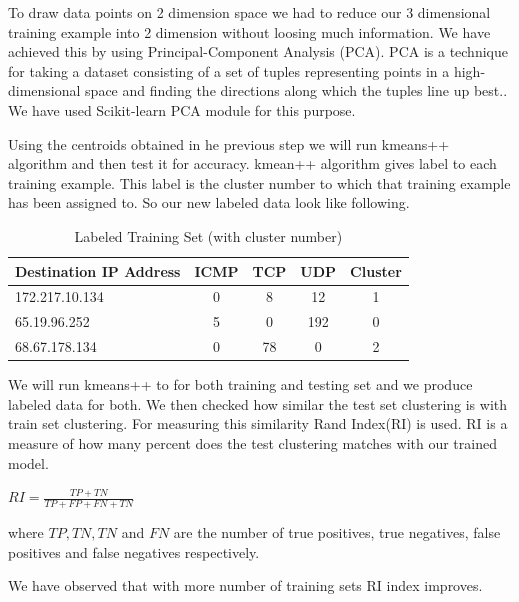 \documentclass[10pt,oneside,a4paper]{article}
\begin{document}
To draw data points on 2 dimension space we had to reduce our 3 dimensional training example into 2 dimension without loosing much information. We have achieved this by using Principal-Component Analysis (PCA). PCA is a technique for taking a dataset consisting of a set of tuples representing points in a high-dimensional space and finding the directions along which the tuples line up best.\cite{pca}. We have used Scikit-learn PCA module for this purpose.

Using the centroids obtained in he previous step we will run kmeans++ algorithm and then test it for accuracy. kmean++ algorithm gives label to each training example. This label is the cluster number to which that training example has been assigned to. So our new labeled data look like following.

\begin{table}[H]
\centering
  \begin{tabular}{| l | c | c | c | c |}
    \hline
    {Destination IP Address}  &ICMP  &TCP &UDP  &Cluster \\
    \hline
    172.217.10.134  & 0     & 8     & 12  &1  \\ \hline
    65.19.96.252    & 5     & 0     & 192 &0  \\ \hline
    68.67.178.134   & 0     & 78    & 0   &2  \\ \hline
  \end{tabular}
\caption{Labeled Training Set (with cluster number)} \label{table:labeled-set}
\end{table}


We will run kmeans++ to for both training and testing set and we produce labeled data for both. We then checked how similar the test set clustering is with train set clustering. For measuring this similarity Rand Index(RI)\cite{ri-index} is used. RI is a measure of how many percent does the test clustering matches with our trained model.

\hspace{4cm} $RI={\frac {TP+TN}{TP+FP+FN+TN}}$

where $TP, TN, TN$ and $FN$ are the number of true positives, true negatives, false positives and false negatives respectively.

We have observed that with more number of training sets RI index improves.
\end{document}
